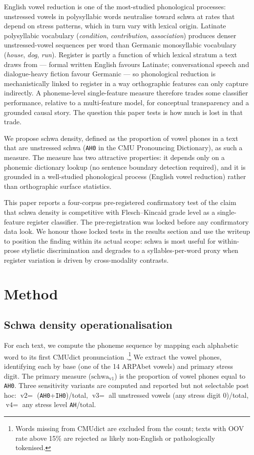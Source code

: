\documentclass[11pt,a4paper]{article}
\begin{document}
English vowel reduction is one of the most-studied phonological
processes: unstressed vowels in polysyllabic words neutralise toward
schwa at rates that depend on stress patterns, which in turn vary with
lexical origin. Latinate polysyllabic vocabulary
(\emph{condition}, \emph{contribution}, \emph{association}) produces
denser unstressed-vowel sequences per word than Germanic monosyllabic
vocabulary (\emph{house}, \emph{dog}, \emph{run}). Register is partly
a function of which lexical stratum a text draws from --- formal
written English favours Latinate; conversational speech and
dialogue-heavy fiction favour Germanic --- so phonological reduction
is mechanistically linked to register in a way orthographic features
can only capture indirectly. A phoneme-level single-feature measure
therefore trades some classifier performance, relative to a
multi-feature model, for conceptual transparency and a grounded
causal story. The question this paper tests is how much is lost in
that trade.

We propose schwa density, defined as the proportion of vowel phones in
a text that are unstressed schwa (\texttt{AH0} in the CMU Pronouncing
Dictionary), as such a measure. The measure has two attractive
properties: it depends only on a phonemic dictionary lookup (no
sentence boundary detection required), and it is grounded in a
well-studied phonological process (English vowel reduction) rather
than orthographic surface statistics.

This paper reports a four-corpus pre-registered confirmatory test of
the claim that schwa density is competitive with Flesch--Kincaid grade
level as a single-feature register classifier. The pre-registration
was locked before any confirmatory data look. We honour those locked
tests in the results section and use the writeup to position the
finding within its actual scope: schwa is most useful for within-prose
stylistic discrimination and degrades to a syllables-per-word proxy
when register variation is driven by cross-modality contrasts.

\section{Method}

\subsection{Schwa density operationalisation}

For each text, we compute the phoneme sequence by mapping each
alphabetic word to its first CMUdict pronunciation
\citep{cmudict}.\footnote{Words missing from CMUdict are excluded from
the count; texts with OOV rate above 15\% are rejected as likely
non-English or pathologically tokenised.} We extract the vowel phones,
identifying each by base (one of the 14 ARPAbet vowels) and primary
stress digit. The primary measure (\(\text{schwa}_{\text{v1}}\)) is the
proportion of vowel phones equal to \texttt{AH0}. Three sensitivity
variants are computed and reported but not selectable post hoc:
\(\text{v2}=\) (\texttt{AH0}+\texttt{IH0})/total,
\(\text{v3}=\) all unstressed vowels (any stress digit 0)/total,
\(\text{v4}=\) any stress level \texttt{AH}/total.
\end{document}
